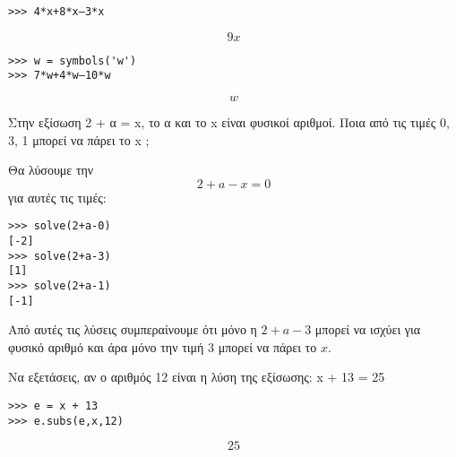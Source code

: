 \begin{lstlisting}
>>> 4*x+8*x–3*x 
\end{lstlisting}

$$9x$$

\begin{lstlisting}
>>> w = symbols('w')
>>> 7*w+4*w–10*w
\end{lstlisting}

$$w$$

\begin{exercise}
Στην εξίσωση 2 + α = x, το α και το x είναι φυσικοί αριθμοί. Ποια από τις τιμές
0, 3, 1 μπορεί να πάρει το x ;
\end{exercise}
Θα λύσουμε την $$2+a-x=0$$ για αυτές τις τιμές:
\begin{lstlisting}
>>> solve(2+a-0)
[-2]
>>> solve(2+a-3)
[1]
>>> solve(2+a-1)
[-1]
\end{lstlisting}
Από αυτές τις λύσεις συμπεραίνουμε ότι μόνο η $2+a-3$ μπορεί να ισχύει για φυσικό αριθμό και άρα μόνο την τιμή $3$ μπορεί να πάρει το $x$.
\begin{exercise}
Να εξετάσεις, αν ο αριθμός 12 είναι η λύση της εξίσωσης: x + 13 = 25
\end{exercise}
\begin{lstlisting}
>>> e = x + 13
>>> e.subs(e,x,12)
\end{lstlisting}
$$25$$
